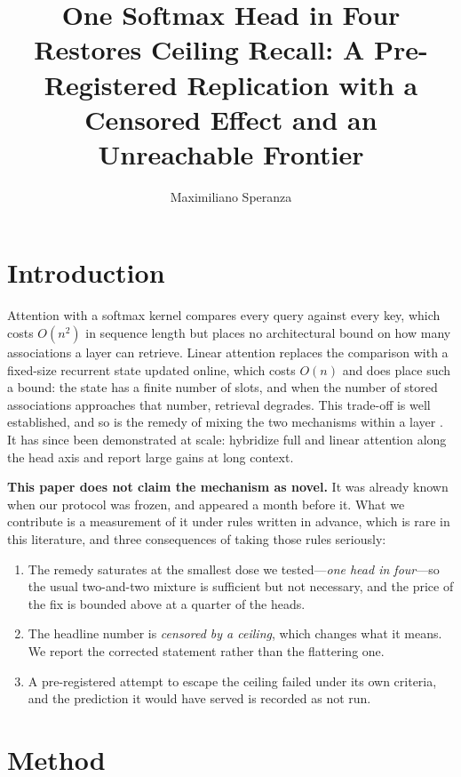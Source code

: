 \documentclass[jou,11pt,donotrepeattitle]{apa7}
\title{One Softmax Head in Four Restores Ceiling Recall: A Pre-Registered
Replication with a Censored Effect and an Unreachable Frontier}
\author{Maximiliano Speranza}
\affiliation{Independent Researcher, Argentina}
\begin{document}
\maketitle

\section{Introduction}

Attention with a softmax kernel compares every query against every key, which costs
$O(n^2)$ in sequence length but places no architectural bound on how many associations a
layer can retrieve. Linear attention replaces the comparison with a fixed-size recurrent
state updated online, which costs $O(n)$ and does place such a bound: the state has a finite
number of slots, and when the number of stored associations approaches that number, retrieval
degrades. This trade-off is well established, and so is the remedy of mixing the two
mechanisms within a layer \parencite{arora2023zoology,arora2024simple,yang2024gated}. It has
since been demonstrated at scale: \textcite{tan2026hydrahead} hybridize full and linear
attention along the head axis and report large gains at long context.

\textbf{This paper does not claim the mechanism as novel.} It was already known when our
protocol was frozen, and \textcite{tan2026hydrahead} appeared a month before it. What we
contribute is a measurement of it under rules written in advance, which is rare in this
literature, and three consequences of taking those rules seriously:

\begin{enumerate}
  \item The remedy saturates at the smallest dose we tested---\emph{one head in four}---so the
        usual two-and-two mixture is sufficient but not necessary, and the price of the fix is
        bounded above at a quarter of the heads.
  \item The headline number is \emph{censored by a ceiling}, which changes what it means. We
        report the corrected statement rather than the flattering one.
  \item A pre-registered attempt to escape the ceiling failed under its own criteria, and the
        prediction it would have served is recorded as not run.
\end{enumerate}

\section{Method}
\end{document}
